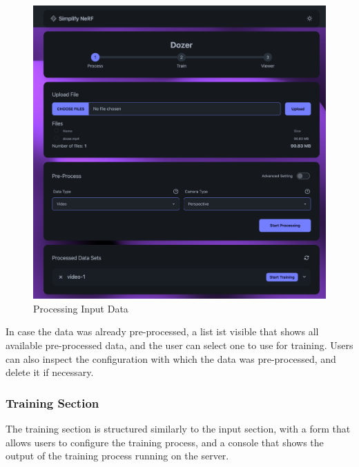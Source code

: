 \begin{figure}[htb]
  \includegraphics[width=\textwidth]{figures/view-process.png}
  \caption{Processing Input Data}
  \label{fig:design:input-section}
\end{figure}

In case the data was already pre-processed, a list ist visible that shows all available pre-processed data, and the user can select one to use for training.
Users can also inspect the configuration with which the data was pre-processed, and delete it if necessary.

\subsubsection{Training Section}

The training section is structured similarly to the input section, with a form that allows users to configure the training process, and a console that shows the output of the training process running on the server.

